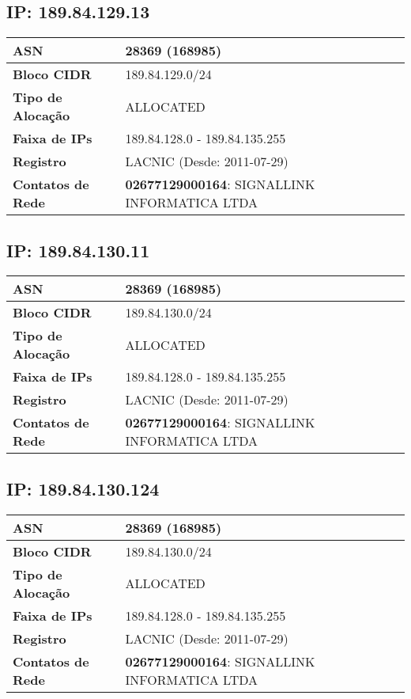     \subsection{IP: 189.84.129.13}
    \begin{tabular}{|l|l|}
    \hline
    \textbf{ASN} & 28369 (168985) \\ \hline
    \textbf{Bloco CIDR} & 189.84.129.0/24 \\ \hline
    \textbf{Tipo de Alocação} & ALLOCATED \\ \hline
    \textbf{Faixa de IPs} & 189.84.128.0 - 189.84.135.255 \\ \hline
    \textbf{Registro} & LACNIC (Desde: 2011-07-29) \\ \hline
        
\textbf{Contatos de Rede} & \textbf{02677129000164}: SIGNALLINK INFORMATICA LTDA 
\\ \hline
\end{tabular}


    \subsection{IP: 189.84.130.11}
    \begin{tabular}{|l|l|}
    \hline
    \textbf{ASN} & 28369 (168985) \\ \hline
    \textbf{Bloco CIDR} & 189.84.130.0/24 \\ \hline
    \textbf{Tipo de Alocação} & ALLOCATED \\ \hline
    \textbf{Faixa de IPs} & 189.84.128.0 - 189.84.135.255 \\ \hline
    \textbf{Registro} & LACNIC (Desde: 2011-07-29) \\ \hline
        
\textbf{Contatos de Rede} & \textbf{02677129000164}: SIGNALLINK INFORMATICA LTDA 
\\ \hline
\end{tabular}


    \subsection{IP: 189.84.130.124}
    \begin{tabular}{|l|l|}
    \hline
    \textbf{ASN} & 28369 (168985) \\ \hline
    \textbf{Bloco CIDR} & 189.84.130.0/24 \\ \hline
    \textbf{Tipo de Alocação} & ALLOCATED \\ \hline
    \textbf{Faixa de IPs} & 189.84.128.0 - 189.84.135.255 \\ \hline
    \textbf{Registro} & LACNIC (Desde: 2011-07-29) \\ \hline
        
\textbf{Contatos de Rede} & \textbf{02677129000164}: SIGNALLINK INFORMATICA LTDA 
\\ \hline
\end{tabular}


